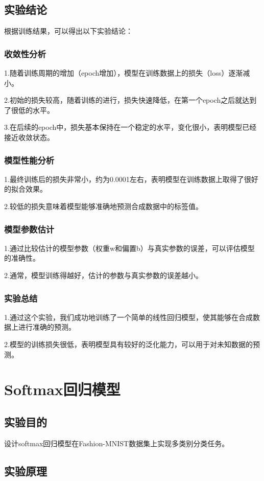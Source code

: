 \documentclass[a4paper,12pt]{article}
\begin{document}
\subsection{实验结论}
根据训练结果，可以得出以下实验结论：

\subsubsection{收敛性分析}
1.随着训练周期的增加（epoch增加），模型在训练数据上的损失（loss）逐渐减小。

2.初始的损失较高，随着训练的进行，损失快速降低，在第一个epoch之后就达到了很低的水平。

3.在后续的epoch中，损失基本保持在一个稳定的水平，变化很小，表明模型已经接近收敛状态。

\subsubsection{模型性能分析}
1.最终训练后的损失非常小，约为0.0001左右，表明模型在训练数据上取得了很好的拟合效果。

2.较低的损失意味着模型能够准确地预测合成数据中的标签值。

\subsubsection{模型参数估计}
1.通过比较估计的模型参数（权重w和偏置b）与真实参数的误差，可以评估模型的准确性。

2.通常，模型训练得越好，估计的参数与真实参数的误差越小。

\subsubsection{实验总结}
1.通过这个实验，我们成功地训练了一个简单的线性回归模型，使其能够在合成数据上进行准确的预测。

2.模型的训练损失很低，表明模型具有较好的泛化能力，可以用于对未知数据的预测。
   
\newpage
\section{Softmax回归模型}
\subsection{实验目的}
设计softmax回归模型在Fashion-MNIST数据集上实现多类别分类任务。
\subsection{实验原理}
\end{document}
